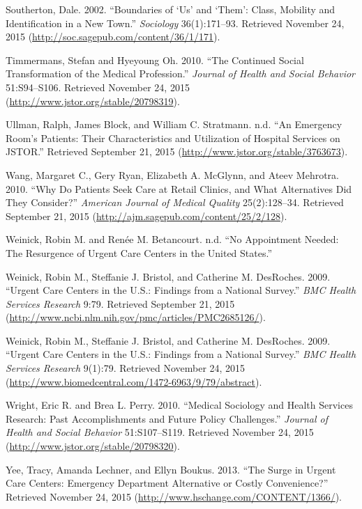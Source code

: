 \documentclass[12pt,twoside]{reedthesis}
\begin{document}
  \hypertarget{ref-southertonux5fboundariesux5f2002}{}
  Southerton, Dale. 2002. ``Boundaries of `Us' and `Them': Class, Mobility
  and Identification in a New Town.'' \emph{Sociology} 36(1):171--93.
  Retrieved November 24, 2015
  (\url{http://soc.sagepub.com/content/36/1/171}).
  
  \hypertarget{ref-timmermansux5fcontinuedux5f2010}{}
  Timmermans, Stefan and Hyeyoung Oh. 2010. ``The Continued Social
  Transformation of the Medical Profession.'' \emph{Journal of Health and
  Social Behavior} 51:S94--S106. Retrieved November 24, 2015
  (\url{http://www.jstor.org/stable/20798319}).
  
  \hypertarget{ref-ullmanux5fPATIENTS}{}
  Ullman, Ralph, James Block, and William C. Stratmann. n.d. ``An
  Emergency Room's Patients: Their Characteristics and Utilization of
  Hospital Services on JSTOR.'' Retrieved September 21, 2015
  (\url{http://www.jstor.org/stable/3763673}).
  
  \hypertarget{ref-wangux5fwhyux5f2010}{}
  Wang, Margaret C., Gery Ryan, Elizabeth A. McGlynn, and Ateev Mehrotra.
  2010. ``Why Do Patients Seek Care at Retail Clinics, and What
  Alternatives Did They Consider?'' \emph{American Journal of Medical
  Quality} 25(2):128--34. Retrieved September 21, 2015
  (\url{http://ajm.sagepub.com/content/25/2/128}).
  
  \hypertarget{ref-WEINECKux5fNOAPPT}{}
  Weinick, Robin M. and Renée M. Betancourt. n.d. ``No Appointment Needed:
  The Resurgence of Urgent Care Centers in the United States.''
  
  \hypertarget{ref-WEINECKux5f2009}{}
  Weinick, Robin M., Steffanie J. Bristol, and Catherine M. DesRoches.
  2009. ``Urgent Care Centers in the U.S.: Findings from a National
  Survey.'' \emph{BMC Health Services Research} 9:79. Retrieved September
  21, 2015 (\url{http://www.ncbi.nlm.nih.gov/pmc/articles/PMC2685126/}).
  
  \hypertarget{ref-weinickux5furgentux5f2009-1}{}
  Weinick, Robin M., Steffanie J. Bristol, and Catherine M. DesRoches.
  2009. ``Urgent Care Centers in the U.S.: Findings from a National
  Survey.'' \emph{BMC Health Services Research} 9(1):79. Retrieved
  November 24, 2015
  (\url{http://www.biomedcentral.com/1472-6963/9/79/abstract}).
  
  \hypertarget{ref-wrightux5fmedicalux5f2010}{}
  Wright, Eric R. and Brea L. Perry. 2010. ``Medical Sociology and Health
  Services Research: Past Accomplishments and Future Policy Challenges.''
  \emph{Journal of Health and Social Behavior} 51:S107--S119. Retrieved
  November 24, 2015 (\url{http://www.jstor.org/stable/20798320}).
  
  \hypertarget{ref-yeeux5fsurgeux5f2013}{}
  Yee, Tracy, Amanda Lechner, and Ellyn Boukus. 2013. ``The Surge in
  Urgent Care Centers: Emergency Department Alternative or Costly
  Convenience?'' Retrieved November 24, 2015
  (\url{http://www.hschange.com/CONTENT/1366/}).


\end{document}
